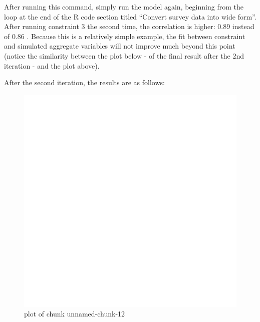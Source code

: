 \begin{Shaded}
\begin{Highlighting}[]
 
\end{Highlighting}
\end{Shaded}
After running this command, simply run the model again, beginning from
the loop at the end of the R code section titled ``Convert survey data
into wide form''. After running constraint 3 the second time, the
correlation is higher: 0.89 instead of 0.86 . Because this is a
relatively simple example, the fit between constraint and simulated
aggregate variables will not improve much beyond this point (notice the
similarity between the plot below - of the final result after the 2nd
iteration - and the plot above).

After the second iteration, the results are as follows:

\begin{Shaded}
\begin{Highlighting}[]
\NormalTok{(}\NormalTok{(}\NormalTok{(} \NormalTok{, }
     \NormalTok{)}
\NormalTok{(} \NormalTok{, } \NormalTok{)}
\end{Highlighting}
\end{Shaded}
\begin{figure}[htbp]
\centering
\includegraphics{figure/unnamed-chunk-12.png}
\caption{plot of chunk unnamed-chunk-12}
\end{figure}

